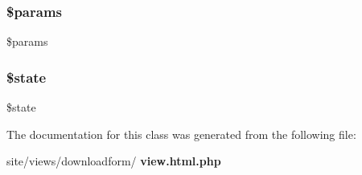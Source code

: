 \subsubsection{\$params}
{\footnotesize\ttfamily \$params\hspace{0.3cm}{\ttfamily [protected]}}

\mbox{\label{classtks__agenda_view_downloadform_ae82306c4f2d17d8dd5c7d8d916b33bed}} 
\subsubsection{\$state}
{\footnotesize\ttfamily \$state\hspace{0.3cm}{\ttfamily [protected]}}



The documentation for this class was generated from the following file\+:\begin{DoxyCompactItemize}
\item 
site/views/downloadform/\textbf{ view.\+html.\+php}\end{DoxyCompactItemize}
